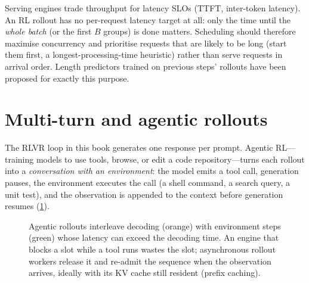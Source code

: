 \begin{systemslens}
Serving engines trade throughput for latency SLOs (TTFT, inter-token latency). An RL rollout
has no per-request latency target at all: only the time until the \emph{whole batch} (or the
first $B$ groups) is done matters. Scheduling should therefore maximise concurrency and
prioritise requests that are likely to be long (start them first, a longest-processing-time
heuristic) rather than serve requests in arrival order. Length predictors trained on previous
steps' rollouts have been proposed for exactly this purpose.
\end{systemslens}

\section{Multi-turn and agentic rollouts}\label{sec:rlsys:agentic}

The RLVR loop in this book generates one response per prompt. Agentic RL---training models to
use tools, browse, or edit a code repository---turns each rollout into a \emph{conversation with
an environment}: the model emits a tool call, generation pauses, the environment executes the
call (a shell command, a search query, a unit test), and the observation is appended to the
context before generation resumes (\cref{fig:rlsys:agentic}).

\begin{figure}[t]
\centering
{}
\caption{Agentic rollouts interleave decoding (orange) with environment steps (green) whose
latency can exceed the decoding time. An engine that blocks a slot while a tool runs wastes
the slot; asynchronous rollout workers release it and re-admit the sequence when the
observation arrives, ideally with its KV cache still resident (prefix caching).}
\label{fig:rlsys:agentic}
\end{figure}

